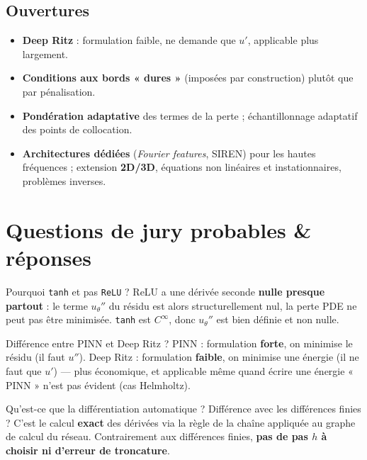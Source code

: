 \documentclass[11pt]{article}
\newcommand{\key}[1]{\textbf{#1}}
\begin{document}
\subsection*{Ouvertures}
\begin{itemize}
  \item \key{Deep Ritz} : formulation faible, ne demande que $u'$, applicable plus
        largement.
  \item \key{Conditions aux bords « dures »} (imposées par construction) plutôt que
        par pénalisation.
  \item \key{Pondération adaptative} des termes de la perte ; échantillonnage
        adaptatif des points de collocation.
  \item \key{Architectures dédiées} (\emph{Fourier features}, SIREN) pour les
        hautes fréquences ; extension \key{2D/3D}, équations non linéaires et
        instationnaires, problèmes inverses.
\end{itemize}

\section{Questions de jury probables \& réponses}

\begin{qbox}{Pourquoi \texttt{tanh} et pas \texttt{ReLU} ?}
ReLU a une dérivée seconde \key{nulle presque partout} : le terme $u_\theta''$ du
résidu est alors structurellement nul, la perte PDE ne peut pas être minimisée.
\texttt{tanh} est $C^\infty$, donc $u_\theta''$ est bien définie et non nulle.
\end{qbox}

\begin{qbox}{Différence entre PINN et Deep Ritz ?}
PINN : formulation \key{forte}, on minimise le résidu (il faut $u''$). Deep Ritz :
formulation \key{faible}, on minimise une énergie (il ne faut que $u'$) — plus
économique, et applicable même quand écrire une énergie « PINN » n'est pas évident
(cas Helmholtz).
\end{qbox}

\begin{qbox}{Qu'est-ce que la différentiation automatique ? Différence avec les différences finies ?}
C'est le calcul \key{exact} des dérivées via la règle de la chaîne appliquée au
graphe de calcul du réseau. Contrairement aux différences finies, \key{pas de pas
$h$ à choisir ni d'erreur de troncature}.
\end{qbox}
\end{document}
